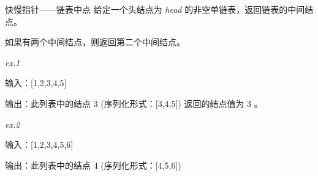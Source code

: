 
\begin{example}{快慢指针——链表中点}
给定一个头结点为 \textsl{head} 的非空单链表，返回链表的中间结点。

如果有两个中间结点，则返回第二个中间结点。

\textsl{ex.1}

输入：[1,2,3,4,5] 

输出：此列表中的结点 3 (序列化形式：[3,4,5])
返回的结点值为 3 。

\textsl{ex.2}

输入：[1,2,3,4,5,6]

输出：此列表中的结点 4 (序列化形式：[4,5,6])
\end{example}